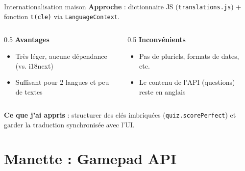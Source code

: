 \documentclass[aspectratio=169]{beamer}
\begin{document}
\begin{frame}{Internationalisation maison}
  \textbf{Approche} : dictionnaire JS (\texttt{translations.js}) + fonction \texttt{t(cle)} via \texttt{LanguageContext}.

  \vspace{0.3cm}
  \begin{columns}
    \begin{column}{0.5\textwidth}
      \textbf{Avantages}
      \begin{itemize}
        \item Très léger, aucune dépendance (vs. i18next)
        \item Suffisant pour 2 langues et peu de textes
      \end{itemize}
    \end{column}
    \begin{column}{0.5\textwidth}
      \textbf{Inconvénients}
      \begin{itemize}
        \item Pas de pluriels, formats de dates, etc.
        \item Le contenu de l'API (questions) reste en anglais
      \end{itemize}
    \end{column}
  \end{columns}

  \vspace{0.3cm}
  \textbf{Ce que j'ai appris} : structurer des clés imbriquées (\texttt{quiz.scorePerfect}) et garder la traduction synchronisée avec l'UI.
\end{frame}

\section{Manette : Gamepad API}
\end{document}
